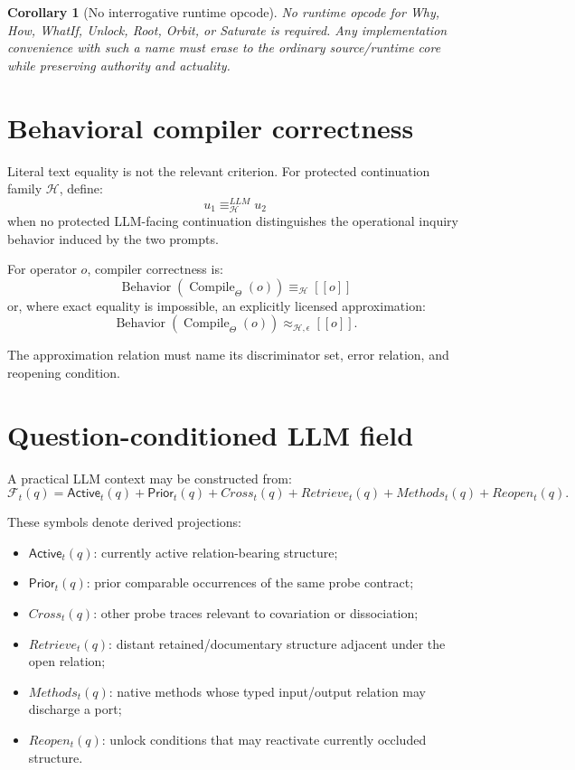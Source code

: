 \documentclass[11pt,oneside]{article}
\newtheorem{corollary}[definition]{Corollary}
\newcommand{\Compile}{\operatorname{Compile}}
\newcommand{\den}[1]{[\![#1]\!]}
\begin{document}
\begin{corollary}[No interrogative runtime opcode]\label{cor:no-interrogative-opcode}
No runtime opcode for \textsf{Why}, \textsf{How}, \textsf{WhatIf}, \textsf{Unlock},
\textsf{Root}, \textsf{Orbit}, or \textsf{Saturate} is required.  Any implementation convenience
with such a name must erase to the ordinary source/runtime core while preserving authority and
actuality.
\end{corollary}

\section{Behavioral compiler correctness}

Literal text equality is not the relevant criterion.  For protected continuation family \(\mathcal H\), define:
\[
u_1\equiv_{\mathcal H}^{LLM}u_2
\]
when no protected LLM-facing continuation distinguishes the operational inquiry behavior induced by the two prompts.

For operator \(o\), compiler correctness is:
\[
\boxed{
\operatorname{Behavior}(\Compile_\Theta(o))
\equiv_{\mathcal H}
\den{o}
}
\]
or, where exact equality is impossible, an explicitly licensed approximation:
\[
\operatorname{Behavior}(\Compile_\Theta(o))
\approx_{\mathcal H,\epsilon}
\den{o}.
\]

The approximation relation must name its discriminator set, error relation, and reopening condition.

\section{Question-conditioned LLM field}

A practical LLM context may be constructed from:
\[
\boxed{
\mathcal F_t(q)
=
 \mathsf{Active}_t(q)
+
 \mathsf{Prior}_t(q)
+
Cross_t(q)
+
Retrieve_t(q)
+
Methods_t(q)
+
Reopen_t(q).
}
\]

These symbols denote derived projections:
\begin{itemize}
\item \(\mathsf{Active}_t(q)\): currently active relation-bearing structure;
\item \(\mathsf{Prior}_t(q)\): prior comparable occurrences of the same probe contract;
\item \(Cross_t(q)\): other probe traces relevant to covariation or dissociation;
\item \(Retrieve_t(q)\): distant retained/documentary structure adjacent under the open relation;
\item \(Methods_t(q)\): native methods whose typed input/output relation may discharge a port;
\item \(Reopen_t(q)\): unlock conditions that may reactivate currently occluded structure.
\end{itemize}
\end{document}
